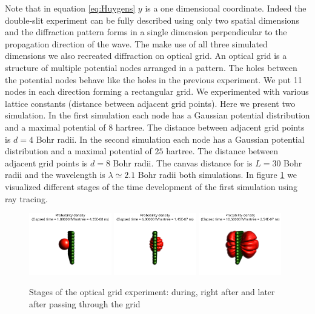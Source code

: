 Note that in equation \ref{eq:Huygens} $y$ is a one dimensional coordinate. Indeed the double-slit experiment can be fully described using only two spatial dimensions and the diffraction pattern forms in a single dimension perpendicular to the propagation direction of the wave.
The make use of all three simulated dimensions we also recreated diffraction on optical grid.
An optical grid is a structure of multiple potential nodes arranged in a pattern.
The holes between the potential nodes behave like the holes in the previous experiment.
We put 11 nodes in each direction forming a rectangular grid.
We experimented with various lattice constants (distance between adjacent grid points).
Here we present two simulation.
In the first simulation each node has a Gaussian potential distribution and a maximal potential of $8$ hartree.
The distance between adjacent grid points is $d = 4$ Bohr radii.
In the second simulation each node has a Gaussian potential distribution and a maximal potential of $25$ hartree.
The distance between adjacent grid points is $d = 8$ Bohr radii.
The canvas distance for is $L=30$ Bohr radii and the wavelength is $\lambda\simeq 2.1$ Bohr radii both simulations.
In figure \ref{fig:optical_grid_stages} we visualized different stages of the time development of the first simulation using ray tracing.
\begin{figure}
	\begin{center}
		\includegraphics[width=0.32\textwidth]{figures/optical_grid_01.png}
		\includegraphics[width=0.32\textwidth]{figures/optical_grid_02.png}
		\includegraphics[width=0.32\textwidth]{figures/optical_grid_03.png}
		\caption{Stages of the optical grid experiment: during, right after and later after passing through the grid}
		\label{fig:optical_grid_stages}
	\end{center}	
\end{figure}
